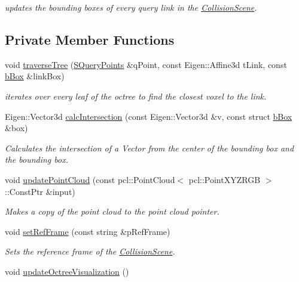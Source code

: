 \begin{DoxyCompactItemize}
\begin{DoxyCompactList}\small\item\em updates the bounding boxes of every query link in the \hyperlink{classCollisionScene}{Collision\-Scene}. \end{DoxyCompactList}\end{DoxyCompactItemize}
\subsection*{Private Member Functions}
\begin{DoxyCompactItemize}
\item 
void \hyperlink{classCollisionScene_a338284876502577c783b745ba7bac385}{traverse\-Tree} (\hyperlink{structCollisionScene_1_1SQueryPoints}{S\-Query\-Points} \&q\-Point, const Eigen\-::\-Affine3d t\-Link, const \hyperlink{structCollisionScene_1_1bBox}{b\-Box} \&link\-Box)
\begin{DoxyCompactList}\small\item\em iterates over every leaf of the octree to find the closest voxel to the link. \end{DoxyCompactList}\item 
Eigen\-::\-Vector3d \hyperlink{classCollisionScene_a287195084a9b8dd1eb7fbbf093766eb1}{calc\-Intersection} (const Eigen\-::\-Vector3d \&v, const struct \hyperlink{structCollisionScene_1_1bBox}{b\-Box} \&box)
\begin{DoxyCompactList}\small\item\em Calculates the intersection of a Vector from the center of the bounding box and the bounding box. \end{DoxyCompactList}\item 
void \hyperlink{classCollisionScene_a16b5e86c6b438cee575dbafb47506970}{update\-Point\-Cloud} (const pcl\-::\-Point\-Cloud$<$ pcl\-::\-Point\-X\-Y\-Z\-R\-G\-B $>$\-::Const\-Ptr \&input)
\begin{DoxyCompactList}\small\item\em Makes a copy of the point cloud to the point cloud pointer. \end{DoxyCompactList}\item 
void \hyperlink{classCollisionScene_a0458b7a7748c991626e7154b6cacbd0a}{set\-Ref\-Frame} (const string \&p\-Ref\-Frame)
\begin{DoxyCompactList}\small\item\em Sets the reference frame of the \hyperlink{classCollisionScene}{Collision\-Scene}. \end{DoxyCompactList}\item 
\hypertarget{classCollisionScene_a493a467161c0bab5d6717f58d96d3e00}{void \hyperlink{classCollisionScene_a493a467161c0bab5d6717f58d96d3e00}{update\-Octree\-Visualization} ()}\label{classCollisionScene_a493a467161c0bab5d6717f58d96d3e00}


\end{DoxyCompactItemize}
